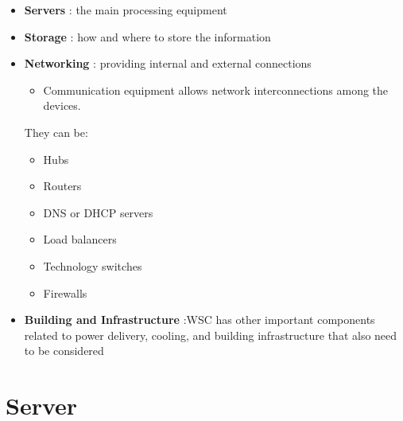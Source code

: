 \documentclass[10pt, oneside]{article}
\begin{document}
\begin{itemize}
    \item \color{green}\textbf{Servers}\color{black}
    : the main processing equipment
    
    \item \color{yellow}\textbf{Storage}\color{black}
    : how and where to store the information
    \item \color{blue}\textbf{Networking}\color{black}
    : providing internal and external connections
    \begin{itemize}
        \item Communication equipment allows network interconnections among the devices.
    \end{itemize} 
    They can be: 
    \begin{itemize}
        \item Hubs
        \item Routers
        \item DNS or DHCP servers
        \item Load balancers
        \item Technology switches
        \item Firewalls
    \end{itemize}
    \item \color{red}\textbf{Building and Infrastructure}\color{black}
    :WSC has other important components related to power delivery, cooling, and building infrastructure that also need to be considered
\end{itemize}




\newpage
\section{Server}
\end{document}
